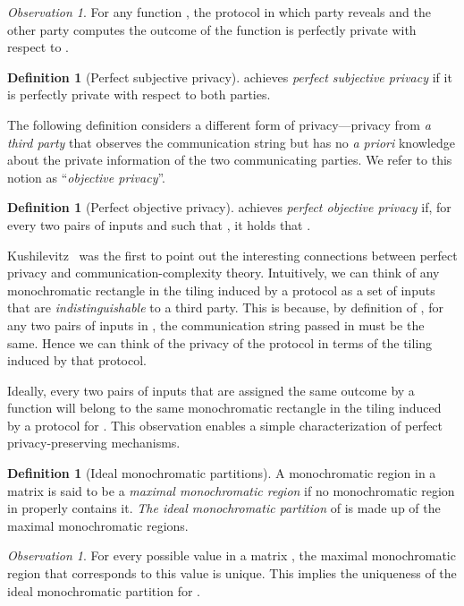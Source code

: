 \documentclass{article}
\theoremstyle{theorem}
\theoremstyle{definition}
\newtheorem{definition}[theorem]{Definition}
\theoremstyle{remark}
\newtheorem{obs}[theorem]{Observation}
\begin{document}
\begin{obs}
For any function , the protocol in which party  reveals 
and the other party computes the outcome of the function is
perfectly private with respect to .
\end{obs}

\begin{definition} [Perfect subjective privacy]
 achieves \emph{perfect subjective privacy} if it is perfectly
private with respect to both parties.
\end{definition}

The following definition considers a different form of privacy---privacy from \emph{a third party} that observes the communication
string but has no \emph{a priori} knowledge about the private
information of the two communicating parties. We refer to this
notion as ``\emph{objective privacy}''.

\begin{definition} [Perfect objective privacy]
 achieves \emph{perfect objective privacy} if, for every two
pairs of inputs  and  such that
, it holds that
.
\end{definition}

Kushilevitz~\cite{K92} was the first to point out the interesting
connections between perfect privacy and communication-complexity theory. Intuitively, we can think of any monochromatic
rectangle  in the tiling induced by a protocol  as a set of
inputs that are \emph{indistinguishable} to a third party. This is
because, by definition of , for any two pairs of inputs in , the
communication string passed in  must be the same. Hence we can
think of the privacy of the protocol in terms of the tiling induced
by that protocol.

Ideally, every two pairs of inputs that are assigned the same
outcome by a function  will belong to the same monochromatic
rectangle in the tiling induced by a protocol for . This
observation enables a simple characterization of perfect
privacy-preserving mechanisms.

\begin{definition} [Ideal monochromatic partitions]
A monochromatic region in a matrix  is said to be a {\em maximal
monochromatic region} if no monochromatic region in  properly
contains it. \emph{The ideal monochromatic partition} of  is made
up of the maximal monochromatic regions.
\end{definition}

\begin{obs}
For every possible value in a matrix , the maximal monochromatic
region that corresponds to this value is unique. This implies the
uniqueness of the ideal monochromatic partition for .
\end{obs}
\end{document}
